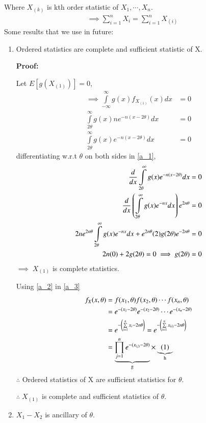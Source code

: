 \documentclass[journal,12pt,twocolumn]{IEEEtran}
\begin{document}
Where $X_{(k)}$ is kth order statistic of $X_1,\cdots,X_n$.
\begin{align}
    \implies \sum\limits_{i=1}^n X_i = \sum\limits_{i=1}^n X_{(i)}\label{a_2}
\end{align}
Some results that we use in future:
\begin{enumerate}
    \item Ordered statistics are complete and sufficient statistic of X.
    
    \textbf{Proof:} 

    Let $E[g(X_{(1)})]=0$,
    \begin{align}
        \implies\int\limits_{-\infty}^{\infty} g(x) f_{X_{(1)}}(x) dx&=0\\
        \int\limits_{2\theta}^{\infty} g(x) n e^{-n(x-2\theta)} dx &=0\\
        \int\limits_{2\theta}^{\infty} g(x) e^{-n(x-2\theta)} dx &=0\label{a_1}
    \end{align}
    differentiating w.r.t $\theta$ on both sides in \eqref{a_1},
    \begin{align}
      \nonumber  \dfrac{d}{dx} \int\limits_{2\theta}^{\infty} g(x) e^{-n(x-2\theta)} dx =0\\
     \nonumber   \dfrac{d}{dx} \left(\int\limits_{2\theta}^{\infty} g(x) e^{-nx} dx\right) e^{2n\theta} =0\\
     \nonumber   2n e^{2n\theta}\int\limits_{2\theta}^{\infty} g(x) e^{-nx} dx+e^{2n\theta}(2)g(2\theta)e^{-2n\theta}=0\\
     \nonumber2n(0)+2g(2\theta)=0\implies g(2\theta)=0
    \end{align}
    $\implies\;X_{(1)}$ is complete statistics.
    
    Using \eqref{a_2} in \eqref{a_3}
    \begin{align}
        f_X(x,\theta)&=f(x_1,\theta)f(x_2,\theta)\cdots f(x_n,\theta)\\
        &=e^{-(x_1-2\theta)}e^{-(x_2-2\theta)}\cdots e^{-(x_n-2\theta)}\\
        &=e^{-\left(\sum\limits_{i=1}^n x_i-2n\theta\right)}=e^{-\left(\sum\limits_{i=1}^n x_{(i)}-2n\theta\right)}\label{a_3}\\
        &=\underbrace{ \prod\limits_{j=1}^n e^{-(x_{(j)}-2\theta)}}_\text{g}\times\underbrace{\left(1\right)}_\text{h}
    \end{align}
    $\therefore$ Ordered statistics of X are sufficient statistics for $\theta$.
    
    $\therefore\;X_{(1)}$ is complete and sufficient statistics of $\theta$. 
    \item $X_1-X_2$ is ancillary of $\theta$.
    

\end{enumerate}
\end{document}
